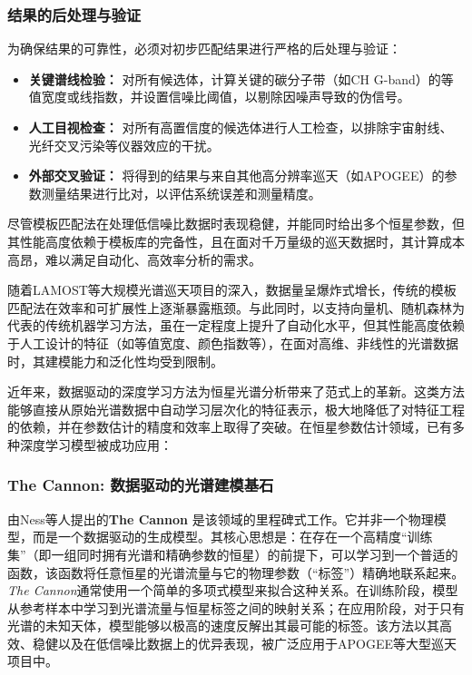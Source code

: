 \subsubsection{结果的后处理与验证}
为确保结果的可靠性，必须对初步匹配结果进行严格的后处理与验证：
\begin{itemize}
    \item \textbf{关键谱线检验：} 对所有候选体，计算关键的碳分子带（如CH G-band）的等值宽度或线指数，并设置信噪比阈值，以剔除因噪声导致的伪信号。
    \item \textbf{人工目视检查：} 对所有高置信度的候选体进行人工检查，以排除宇宙射线、光纤交叉污染等仪器效应的干扰。
    \item \textbf{外部交叉验证：} 将得到的结果与来自其他高分辨率巡天（如APOGEE）的参数测量结果进行比对，以评估系统误差和测量精度。
\end{itemize}

尽管模板匹配法在处理低信噪比数据时表现稳健，并能同时给出多个恒星参数，但其性能高度依赖于模板库的完备性，且在面对千万量级的巡天数据时，其计算成本高昂，难以满足自动化、高效率分析的需求。



随着LAMOST等大规模光谱巡天项目的深入，数据量呈爆炸式增长，传统的模板匹配法在效率和可扩展性上逐渐暴露瓶颈。与此同时，以支持向量机、随机森林为代表的传统机器学习方法，虽在一定程度上提升了自动化水平，但其性能高度依赖于人工设计的特征（如等值宽度、颜色指数等），在面对高维、非线性的光谱数据时，其建模能力和泛化性均受到限制。

近年来，数据驱动的深度学习方法为恒星光谱分析带来了范式上的革新。这类方法能够直接从原始光谱数据中自动学习层次化的特征表示，极大地降低了对特征工程的依赖，并在参数估计的精度和效率上取得了突破。在恒星参数估计领域，已有多种深度学习模型被成功应用：

\subsubsection{The Cannon: 数据驱动的光谱建模基石}
\label{subsec:cannon}
由Ness等人提出的\textbf{The Cannon} \cite{ness2015cannon}是该领域的里程碑式工作。它并非一个物理模型，而是一个数据驱动的生成模型。其核心思想是：在存在一个高精度“训练集”（即一组同时拥有光谱和精确参数的恒星）的前提下，可以学习到一个普适的函数，该函数将任意恒星的光谱流量与它的物理参数（“标签”）精确地联系起来。\textit{The Cannon}通常使用一个简单的多项式模型来拟合这种关系。在训练阶段，模型从参考样本中学习到光谱流量与恒星标签之间的映射关系；在应用阶段，对于只有光谱的未知天体，模型能够以极高的速度反解出其最可能的标签。该方法以其高效、稳健以及在低信噪比数据上的优异表现，被广泛应用于APOGEE等大型巡天项目中。

